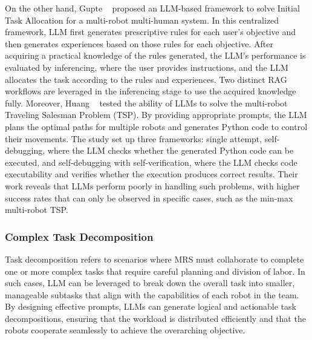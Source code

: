 On the other hand, Gupte \etal~\cite{gupte_rebel_2024} proposed an LLM-based framework to solve Initial Task Allocation for a multi-robot multi-human system. In this centralized framework, LLM first generates prescriptive rules for each user's objective and then generates experiences based on those rules for each objective. After acquiring a practical knowledge of the rules generated, the LLM's performance is evaluated by inferencing, where the user provides instructions, and the LLM allocates the task according to the rules and experiences. Two distinct RAG workflows are leveraged in the inferencing stage to use the acquired knowledge fully.
Moreover, Huang \etal~\cite{huang2024words} tested the ability of LLMs to solve the multi-robot Traveling Salesman Problem (TSP). By providing appropriate prompts, the LLM plans the optimal paths for multiple robots and generates Python code to control their movements. The study set up three frameworks: single attempt, self-debugging, where the LLM checks whether the generated Python code can be executed, and self-debugging with self-verification, where the LLM checks code executability and verifies whether the execution produces correct results. Their work reveals that LLMs perform poorly in handling such problems, with higher success rates that can only be observed in specific cases, such as the min-max multi-robot TSP. 

\subsubsection{Complex Task Decomposition}
 Task decomposition refers to scenarios where MRS must collaborate to complete one or more complex tasks that require careful planning and division of labor. In such cases, LLM can be leveraged to break down the overall task into smaller, manageable subtasks that align with the capabilities of each robot in the team. By designing effective prompts, LLMs can generate logical and actionable task decompositions, ensuring that the workload is distributed efficiently and that the robots cooperate seamlessly to achieve the overarching objective.

